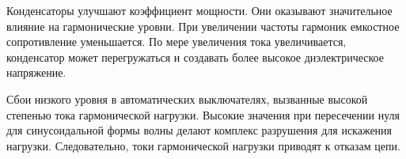 Конденсаторы улучшают коэффициент мощности. Они оказывают значительное влияние на гармонические уровни. При увеличении частоты гармоник емкостное сопротивление уменьшается. По мере увеличения тока увеличивается, конденсатор может перегружаться и создавать более высокое диэлектрическое напряжение.

Сбои низкого уровня в автоматических выключателях, вызванные высокой степенью тока гармонической нагрузки. Высокие значения при пересечении нуля для синусоидальной формы волны делают комплекс разрушения для искажения нагрузки. Следовательно, токи гармонической нагрузки приводят к отказам цепи.

%
